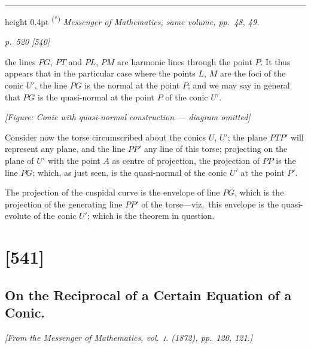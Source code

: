 \documentclass[11pt,a4paper]{book}
\begin{document}
\smallskip
\hrule height 0.4pt
\smallskip
\textsuperscript{(*)} \textit{Messenger of Mathematics, same volume, pp.~48, 49.}

\clearpage

\bigskip
\textit{p.~520 [540]}
\smallskip

the lines $PG$, $PT$ and $PL$, $PM$ are harmonic lines through the point $P$. It thus appears that in the particular case where the points $L$, $M$ are the foci of the conic $U'$, the line $PG$ is the normal at the point $P$; and we may say in general that $PG$ is the quasi-normal at the point $P$ of the conic $U'$.

\begin{center}
\textit{[Figure: Conic with quasi-normal construction --- diagram omitted]}
\end{center}

Consider now the torse circumscribed about the conics $U$, $U'$; the plane $PTP'$ will represent any plane, and the line $PP'$ any line of this torse; projecting on the plane of $U'$ with the point $A$ as centre of projection, the projection of $PP$ is the line $PG$; which, as just seen, is the quasi-normal of the conic $U'$ at the point $P'$.

The projection of the cuspidal curve is the envelope of line $PG$, which is the projection of the generating line $PP'$ of the torse---viz.\ this envelope is the quasi-evolute of the conic $U'$; which is the theorem in question.

\clearpage

\section{[541]}
\subsection{On the Reciprocal of a Certain Equation of a Conic.}

\begin{center}
\textit{[From the Messenger of Mathematics, vol.~\textsc{i}. (1872), pp.~120, 121.]}
\end{center}
\end{document}
